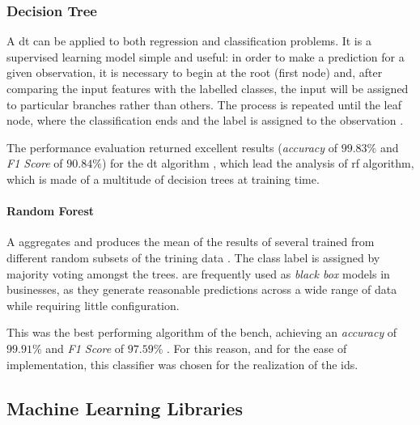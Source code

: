 \subsubsection{Decision Tree}
\label{subsubsec:dt}

A \gls{dt} can be applied to both regression and classification problems. It is a supervised learning model simple and useful: in order to make a prediction for a given observation, it is necessary to begin at the root (first node) and, after comparing the input features with the labelled classes, the input will be assigned to particular branches rather than others. The process is repeated until the leaf node, where the classification ends and the label is assigned to the observation \cite[p. 307]{James2014}.
\par The performance evaluation returned excellent results (\textit{accuracy} of $99.83\%$ and \textit{F1 Score} of $90.84\%$) for the \gls{dt} algorithm \cite{Mozley2020}, which lead the analysis of \gls{rf} algorithm, which is made of a multitude of decision trees at training time.

\paragraph{Random Forest}
\label{par:rf}

A  aggregates and produces the mean of the results of several  trained from different random subsets of the trining data \cite[p. 324]{James2014}. The class label is assigned by majority voting amongst the trees.  are frequently used as \textit{black box} models in businesses, as they generate reasonable predictions across a wide range of data while requiring little configuration.
\par This was the best performing algorithm of the bench, achieving an \textit{accuracy} of $99.91\%$ and \textit{F1 Score} of $97.59\%$ \cite{Mozley2020}. For this reason, and for the ease of implementation, this classifier was chosen for the realization of the \gls{ids}.


\subsection{Machine Learning Libraries}
\label{subsec:ml-libraries}

